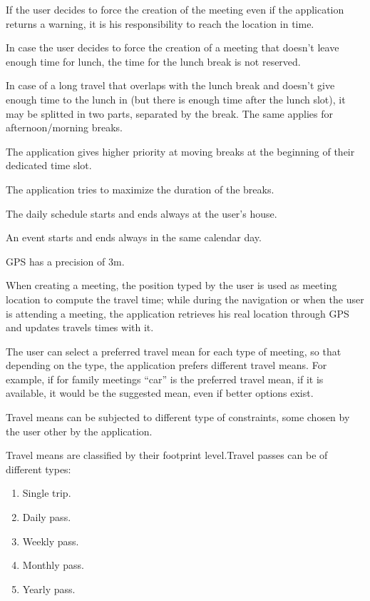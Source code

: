 \begin{list}
\item
If the user decides to force the creation of the meeting even if the application returns a warning, it is his responsibility to reach the location in time.
\item
In case the user decides to force the creation of a meeting that doesn’t leave enough time for lunch, the time for the lunch break is not reserved.
\item
In case of a long travel that overlaps with the lunch break and doesn’t give enough time to the lunch in (but there is enough time after the lunch slot), it may be splitted in two parts, separated by the break. The same applies for afternoon/morning breaks.
\item
The application gives higher priority at moving breaks at the beginning of their dedicated time slot.
\item
The application tries to maximize the duration of the breaks.
\item
The daily schedule starts and ends always at the user’s house.
\item
An event starts and ends always in the same calendar day.
\item
GPS has a precision of 3m.
\item
When creating a meeting, the position typed by the user is used as meeting location to compute the travel time; while during the navigation or when the user is attending a meeting, the application retrieves his real location through GPS and updates travels times with it.
\item
The user can select a preferred travel mean for each type of meeting, so that depending on the type, the application prefers different travel means. For example, if for family meetings “car” is the preferred travel mean, if it is available, it would be the suggested mean, even if better options exist.
\item
Travel means can be subjected to different type of constraints, some chosen by the user other by the application.
\item
Travel means are classified by their footprint level.Travel passes can be of different types:
\begin{enumerate}
\item
Single trip.
\item
Daily pass.
\item
Weekly pass.
\item
Monthly pass.
\item
Yearly pass.
\end{enumerate}


\end{list}
